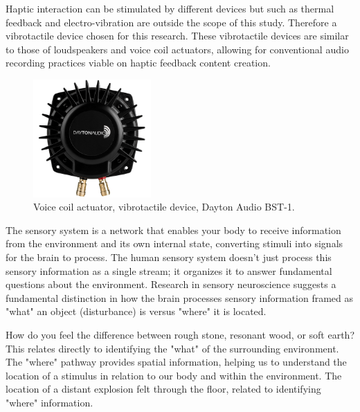             Haptic interaction can be stimulated by different devices but such as thermal feedback and electro-vibration are outside the scope of this study. Therefore a vibrotactile device chosen for this research. These vibrotactile devices are similar to those of loudspeakers and voice coil actuators\cite{Audio-Tactile_Rendering}, allowing for conventional audio recording practices viable on haptic feedback content creation.\par

            \begin{figure}[H]
                \centering
                \includegraphics[width=0.4\textwidth]{images/vibrotactile_bass-shaker.jpg}
                \caption{Voice coil actuator, vibrotactile device, Dayton Audio BST-1.}
                \label{fig:VCA}
            \end{figure}

            The sensory system is a network that enables your body to receive information from the environment and its own internal state, converting stimuli into signals for the brain to process. The human sensory system doesn't just process this sensory information as a single stream; it organizes it to answer fundamental questions about the environment\cite{What_vs_Where_in_Touch}. Research in sensory neuroscience suggests a fundamental distinction in how the brain processes sensory information framed as "what" an object (disturbance) is versus "where" it is located.\par

            How do you feel the difference between rough stone, resonant wood, or soft earth? This relates directly to identifying the "what" of the surrounding environment. The "where" pathway provides spatial information, helping us to understand the location of a stimulus in relation to our body and within the environment. The location of a distant explosion felt through the floor, related to identifying "where" information.\par

